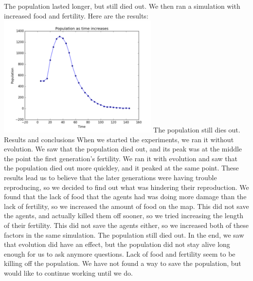 \documentclass[11pt]{article}
\begin{document}
\begin{multicols}{2}
The population lasted longer, but still died out. We then ran a simulation with increased food and fertility. Here are the results: \newline
\includegraphics[width=80mm]{both.PNG} \newline
The population still dies out. \newline
\center 
Results and conclusions
\flushleft
When we started the experiments, we ran it without evolution. We saw that the population died out, and its peak was at the middle the point the first generation's fertility. We ran it with evolution and saw that the population died out more quickley, and it peaked at the same point. These results lead us to believe that the later generations were having trouble reproducing, so we decided to find out what was hindering their reproduction. We found that the lack of food that the agents had was doing more damage than the lack of fertility, so we increased the amount of food on the map. This did not save the agents, and actually killed them off sooner, so we tried increasing the length of their fertility. This did not save the agents either, so we increased both of these factors in the same simulation. The population still died out. \newline
In the end, we saw that evolution did have an effect, but the population did not stay alive long enough for us to ask anymore questions. Lack of food and fertility seem to be killing off the population. We have not found a way to save the population, but would like to continue working until we do.









\end{multicols}
\end{document}
